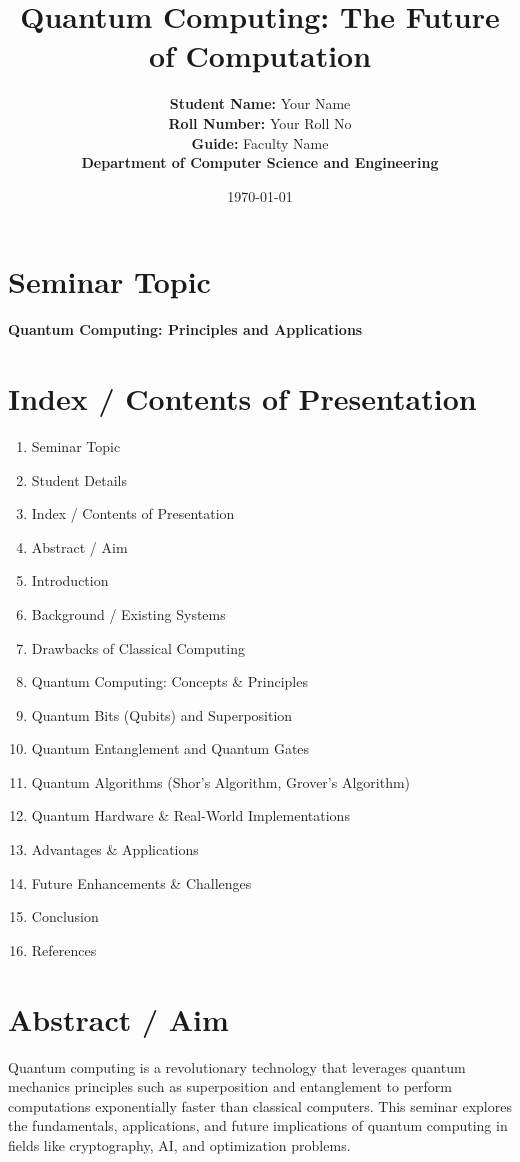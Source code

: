 \documentclass[a4paper,12pt]{article}
\title{\textbf{Quantum Computing: The Future of Computation}}
\author{\textbf{Student Name:} Your Name \\ 
    \textbf{Roll Number:} Your Roll No \\ 
    \textbf{Guide:} Faculty Name \\ 
    \textbf{Department of Computer Science and Engineering}}
\date{\today}
\begin{document}
\maketitle

\section{Seminar Topic}
\textbf{Quantum Computing: Principles and Applications}

\section{Index / Contents of Presentation}
\begin{enumerate}
    \item Seminar Topic
    \item Student Details
    \item Index / Contents of Presentation
    \item Abstract / Aim
    \item Introduction
    \item Background / Existing Systems
    \item Drawbacks of Classical Computing
    \item Quantum Computing: Concepts \& Principles
    \item Quantum Bits (Qubits) and Superposition
    \item Quantum Entanglement and Quantum Gates
    \item Quantum Algorithms (Shor’s Algorithm, Grover’s Algorithm)
    \item Quantum Hardware \& Real-World Implementations
    \item Advantages \& Applications
    \item Future Enhancements \& Challenges
    \item Conclusion
    \item References
\end{enumerate}

\section{Abstract / Aim}
Quantum computing is a revolutionary technology that leverages quantum mechanics principles such as superposition and entanglement to perform computations exponentially faster than classical computers. This seminar explores the fundamentals, applications, and future implications of quantum computing in fields like cryptography, AI, and optimization problems.
\end{document}
